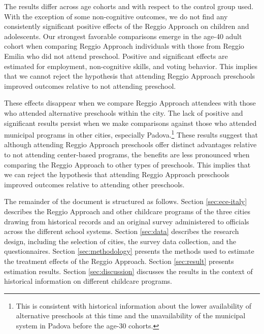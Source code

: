 The results differ across age cohorts and with respect to the control group used. With the exception of some non-cognitive outcomes, we do not find any consistently significant positive effects of the Reggio Approach on children and adolescents. Our strongest favorable comparisons emerge in the age-40 adult cohort when comparing Reggio Approach individuals with those from Reggio Emilia who did not attend preschool. Positive and significant effects are estimated for employment, non-cognitive skills, and voting behavior. This implies that we cannot reject the hypothesis that attending Reggio Approach preschools improved outcomes relative to not attending preschool.

These effects disappear when we compare Reggio Approach attendees with those who attended alternative preschools within the city. The lack of positive and significant results persist when we make comparisons against those who attended municipal programs in other cities, especially Padova.\footnote{This is consistent with historical information about the lower availability of alternative preschools at this time and the unavailability of the municipal system in Padova before the age-30 cohorts.} These results suggest that although attending Reggio Approach preschools offer distinct advantages relative to not attending center-based programs, the benefits are less pronounced when comparing the Reggio Approach to other types of preschools. This implies that we can reject the hypothesis that attending Reggio Approach preschools improved outcomes relative to attending other preschools. 

The remainder of the document is structured as follows. Section \ref{sec:ece-italy} describes the Reggio Approach and other childcare programs of the three cities drawing from historical records and an original survey administered to officials across the different school systems. Section \ref{sec:data} describes the research design, including the selection of cities, the survey data collection, and the questionnaires. Section \ref{sec:methodology} presents the methods used to estimate the treatment effects of the Reggio Approach. Section \ref{sec:result} presents estimation results. Section \ref{sec:discussion} discusses the results in the context of historical information on different childcare programs.

